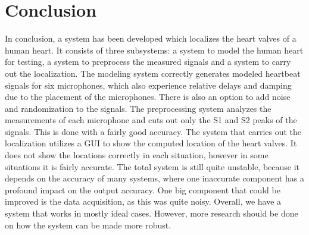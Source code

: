 \chapter{Conclusion}
In conclusion, a system has been developed which localizes the heart valves of a human heart. It consists of three subsystems: a system to model the human heart for testing, a system to preprocess the measured signals and a system to carry out the localization.
The modeling system correctly generates modeled heartbeat signals for six microphones, which also experience relative delays and damping due to the placement of the microphones. There is also an option to add noise and randomization to the signals. 
The preprocessing system analyzes the measurements of each microphone and cuts out only the S1 and S2 peaks of the signals. This is done with a fairly good accuracy.
The system that carries out the localization utilizes a GUI to show the computed location of the heart valves. It does not show the locations correctly in each situation, however in some situations it is fairly accurate. 
The total system is still quite unstable, because it depends on the accuracy of many systems, where one inaccurate component has a profound impact on the output accuracy. One big component that could be improved is the data acquisition, as this was quite noisy.
Overall, we have a system that works in mostly ideal cases. However, more research should be done on how the system can be made more robust.